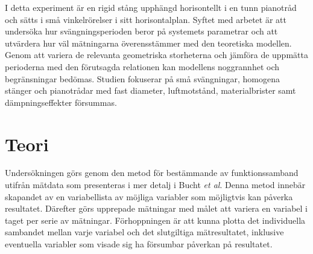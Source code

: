 \documentclass[a4paper]{article}
\begin{document}
I detta experiment är en rigid stång upphängd horisontellt i en tunn pianotråd och sätts i små vinkelrörelser i sitt horisontalplan. Syftet med arbetet är att undersöka hur svängningsperioden beror på systemets parametrar och att utvärdera hur väl mätningarna överensstämmer med den teoretiska modellen. Genom att variera de relevanta geometriska storheterna och jämföra de uppmätta perioderna med den förutsagda relationen kan modellens noggrannhet och begränsningar bedömas. Studien fokuserar på små svängningar, homogena stänger och pianotrådar med fast diameter, luftmotstånd, materialbrister samt dämpningseffekter försummas.


%

\newpage
\section{Teori}\label{s:teori}

Undersökningen görs genom den metod för bestämmande av funktionssamband utifrån mätdata som presenteras i mer detalj i Bucht \textit{et al}.\cite{Compendium} Denna metod innebär skapandet av en variabellista av möjliga variabler som möjligtvis kan påverka resultatet. Därefter görs upprepade mätningar med målet att variera en variabel i taget per serie av mätningar. Förhoppningen är att kunna plotta det individuella sambandet mellan varje variabel och det slutgiltiga mätresultatet, inklusive eventuella variabler som visade sig ha försumbar påverkan på resultatet.
\end{document}
